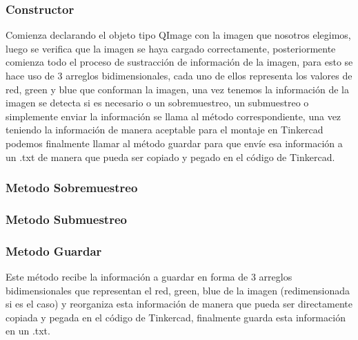 \documentclass{article}
\begin{document}
    \begin{flushleft}
    \subsubsection{Constructor}
    Comienza declarando el objeto tipo QImage con la imagen que nosotros elegimos, luego se verifica que la imagen se haya cargado correctamente, posteriormente comienza todo el proceso de sustracción de información de la imagen, para esto se hace uso de 3 arreglos bidimensionales, cada uno de ellos representa los valores de red, green y blue que conforman la imagen, una vez tenemos la información de la imagen se detecta si es necesario o un sobremuestreo, un submuestreo o simplemente enviar la información se llama al método correspondiente, una vez teniendo la información de manera aceptable para el montaje en Tinkercad podemos finalmente llamar al método guardar para que envíe esa información a un .txt de manera que pueda ser copiado y pegado en el código de Tinkercad.
    \end{flushleft}
    
    \begin{flushleft}
    \subsubsection{Metodo Sobremuestreo}
        
    \end{flushleft}
    
    \begin{flushleft}
    \subsubsection{Metodo Submuestreo}
        
    \end{flushleft}
    
    \begin{flushleft}
    \subsubsection{Metodo Guardar}
    Este método recibe la información a guardar en forma de 3 arreglos bidimensionales que representan el red, green, blue de la imagen (redimensionada si es el caso) y reorganiza esta información de manera que pueda ser directamente copiada y pegada en el código de Tinkercad, finalmente guarda esta información en un .txt.
    \end{flushleft}
        
\end{document}

